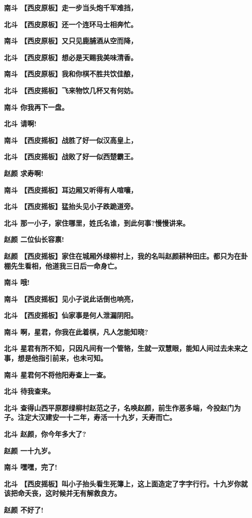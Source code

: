 \textbf{南斗 【西皮原板】走一步当头炮千军难挡，}

\textbf{北斗 【西皮原板】还一个连环马士相奔忙。}

\textbf{南斗 【西皮原板】又只见鹿脯酒从空而降，}

\textbf{北斗 【西皮原板】想必是天赐我美味清香。}

\textbf{南斗 【西皮原板】我和你棋不胜共饮佳酿，}

\textbf{北斗 【西皮摇板】飞来物饮几杯又有何妨。}

\textbf{南斗 你我再下一盘。}

\textbf{北斗 请啊!}

\textbf{南斗 【西皮摇板】战胜了好一似汉高皇上，}

\textbf{北斗 【西皮摇板】战败了好一似西楚霸王。}

\textbf{赵颜 求寿啊!}

\textbf{南斗 【西皮摇板】耳边厢又听得有人喧嚷，}

\textbf{北斗 【西皮摇板】猛抬头见小子跌跪道旁。}

\textbf{北斗 那一小子，家住哪里，姓氏名谁，到此何事?慢慢讲来。}

\textbf{赵颜 二位仙长容禀!}

\textbf{赵颜
【西皮摇板】家住在城厢外绿柳村上，我的名叫赵颜耕种田庄。都只为在卦棚先生看相，他道我三日后一命身亡。}

\textbf{南斗 哦!}

\textbf{南斗 【西皮摇板】见小子说此话倒也响亮，}

\textbf{北斗 【西皮摇板】仙家事是何人泄漏阴阳。}

\textbf{南斗 啊，星君，你我在此着棋，凡人怎能知晓?}

\textbf{北斗
星君有所不知，只因凡间有一个管辂，生就一双慧眼，能知人间过去未来之事，想是他指引前来，也未可知。}

\textbf{南斗 星君何不将他阳寿查上一查。}

\textbf{北斗 待我查来。}

\textbf{北斗
查得山西平原郡绿柳村赵范之子，名唤赵颜，前生作恶多端，今投赵门为子。注定大汉建安一十二年，寿活一十九岁，夭寿而亡。}

\textbf{北斗 赵颜，你今年多大了?}

\textbf{赵颜 一十九岁。}

\textbf{南斗 嘿嘿，完了!}

\textbf{北斗
【西皮摇板】叫小子抬头看生死簿上，这上面造定了字字行行。十九岁你就该把命夭丧，这时候并无有解救良方。}

\textbf{赵颜 不好了!}

